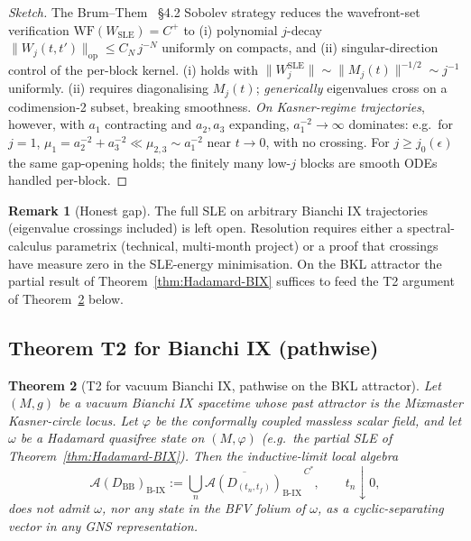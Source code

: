 \documentclass[11pt]{article}
\newtheorem{theorem}{Theorem}
\theoremstyle{definition}
\newtheorem{remark}[theorem]{Remark}
\renewcommand{\AA}{\mathcal{A}}
\newcommand{\BIX}{\mathrm{B\text{-}IX}}
\newcommand{\BB}{\mathrm{BB}}
\begin{document}
\begin{proof}[Sketch]
The Brum--Them~\cite{BrumThem2013} \S4.2 Sobolev strategy reduces the wavefront-set verification $\mathrm{WF}(W_{\mathrm{SLE}})=C^+$ to (i) polynomial $j$-decay $\|W_j(t,t')\|_{\mathrm{op}}\le C_N\,j^{-N}$ uniformly on compacts, and (ii) singular-direction control of the per-block kernel. (i) holds with $\|W_j^{\mathrm{SLE}}\|\sim \|M_j(t)\|^{-1/2}\sim j^{-1}$ uniformly. (ii) requires diagonalising $M_j(t)$; \emph{generically} eigenvalues cross on a codimension-2 subset, breaking smoothness. \emph{On Kasner-regime trajectories}, however, with $a_1$ contracting and $a_2,a_3$ expanding, $a_1^{-2}\to\infty$ dominates: e.g.\ for $j=1$, $\mu_1=a_2^{-2}+a_3^{-2}\ll \mu_{2,3}\sim a_1^{-2}$ near $t\to 0$, with no crossing. For $j\ge j_0(\epsilon)$ the same gap-opening holds; the finitely many low-$j$ blocks are smooth ODEs handled per-block.
\end{proof}

\begin{remark}[Honest gap]\label{rem:Hadamard-BIX-gap}
The full SLE on arbitrary Bianchi IX trajectories (eigenvalue crossings included) is left open. Resolution requires either a spectral-calculus parametrix (technical, multi-month project) or a proof that crossings have measure zero in the SLE-energy minimisation. On the BKL attractor the partial result of Theorem~\ref{thm:Hadamard-BIX} suffices to feed the T2 argument of Theorem~\ref{thm:T2BIX} below.
\end{remark}

\subsection{Theorem T2 for Bianchi IX (pathwise)}\label{sec:T2-BIX}

\begin{theorem}[T2 for vacuum Bianchi IX, pathwise on the BKL attractor]\label{thm:T2BIX}
Let $(M,g)$ be a vacuum Bianchi IX spacetime whose past attractor is the Mixmaster Kasner-circle locus. Let $\varphi$ be the conformally coupled massless scalar field, and let $\omega$ be a Hadamard quasifree state on $(M,\varphi)$ (e.g.\ the partial SLE of Theorem~\ref{thm:Hadamard-BIX}). Then the inductive-limit local algebra
\begin{equation*}
\AA(D_\BB)_\BIX := \overline{\bigcup_{n}\AA(D_{(t_n,t_f)})_\BIX}^{\,C^*},\qquad t_n\downarrow 0,
\end{equation*}
does not admit $\omega$, nor any state in the BFV folium of $\omega$, as a cyclic-separating vector in any GNS representation.
\end{theorem}
\end{document}

